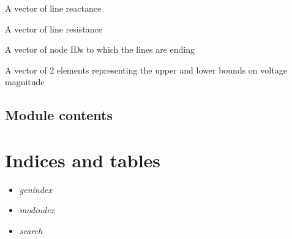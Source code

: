 \documentclass[letterpaper,10pt,english]{sphinxmanual}
\begin{document}
\begin{fulllineitems}
\begin{fulllineitems}
\label{ropf:ropf.Simulation.NetworkModel.reactance}
A vector of line reactance

\end{fulllineitems}


\begin{fulllineitems}
\label{ropf:ropf.Simulation.NetworkModel.resistance}
A vector of line resistance

\end{fulllineitems}


\begin{fulllineitems}
\label{ropf:ropf.Simulation.NetworkModel.to_node}
A vector of node IDs to which the lines are ending

\end{fulllineitems}


\begin{fulllineitems}
\label{ropf:ropf.Simulation.NetworkModel.voltage_limit}
A vector of 2 elements representing the upper and lower bounds on voltage magnitude

\end{fulllineitems}


\end{fulllineitems}



\section{Module contents}
\label{ropf:module-contents}\label{ropf:module-ropf}

\chapter{Indices and tables}
\label{index:indices-and-tables}\begin{itemize}
\item {} 
\emph{genindex}

\item {} 
\emph{modindex}

\item {} 
\emph{search}

\end{itemize}
\end{document}
